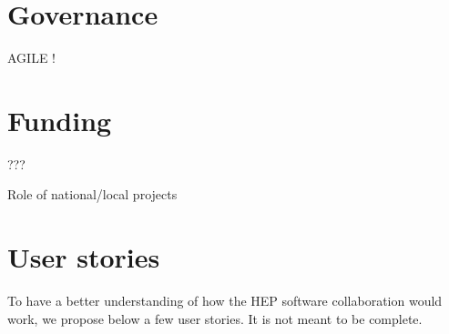 \documentclass[11pt]{article} %
\begin{document}

\section{Governance}

AGILE !

\section{Funding}

???

Role of national/local projects

\section{User stories}
To have a better understanding of how the HEP software collaboration would work, we propose below a few user stories. It is not meant to be complete.
\end{document}
